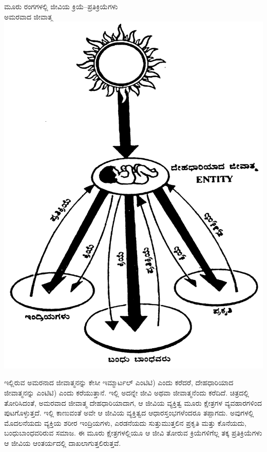 \begin{center}
ಮೂರು ರಂಗಗಳಲ್ಲಿ ಜೀವಿಯ ಕ್ರಿಯೆ–ಪ್ರತಿಕ್ರಿಯೆಗಳು\\
 ಅಮರವಾದ ಜೀವಾತ್ಮ \\\includegraphics[scale=0.8]{"images/chap6_fig1.png"}
\end{center}

ಇಲ್ಲಿರುವ ಅಮರನಾದ ಜೀವಾತ್ಮನನ್ನು ಕೇಸೀ ಇಮ್ಮಾರ್ಟಲ್ ಎಂಟಿಟಿ) ಎಂದು ಕರೆದರೆ, ದೇಹಧಾರಿಯಾದ ಜೀವಾತ್ಮನನ್ನು ಎಂಟಿಟಿ) ಎಂದು ಕರೆಯುತ್ತಾನೆ. ಇಲ್ಲಿ ಅದನ್ನೇ ಜೀವಿ ಅಥವಾ ಜೀವಾತ್ಮನೆಂದು ಕರೆದಿದೆ. ಚಿತ್ರದಲ್ಲಿ ತೋರಿಸಿದಂತೆ, ಅಮರವಾದ ಜೀವಾತ್ಮ ದೇಹಧಾರಿಯಾದಾಗ, ಆ ಜೀವಿಯ ವ್ಯಕ್ತಿತ್ವ ಮೂರು ಕ್ಷೇತ್ರಗಳ ವ್ಯವಹಾರಗಳಿಂದ ಪುಟಗೊಳ್ಳುತ್ತದೆ. ಇಲ್ಲಿ ಕಾಣುವಂತೆ ಅವೇ ಆ ಜೀವಿಯ ವ್ಯಕ್ತಿತ್ವದ ಆಧಾರಸ್ತಂಭಗಳೆಂದರೂ ತಪ್ಪಾಗದು. ಅವುಗಳಲ್ಲಿ ಮೊದಲನೆಯದು ವ್ಯಕ್ತಿಯ ಶರೀರ ಇಂದ್ರಿಯಗಳು, ಎರಡನೆಯದು ಸುತ್ತುಮುತ್ತಲಿನ ಪ್ರಕೃತಿ ಮತ್ತು ಕೊನೆಯದು, ಬಂಧುಬಾಂಧವರಿರುವ ಸಮಾಜ. ಈ ಮೂರು ಕ್ಷೇತ್ರಗಳಲ್ಲಿಯೂ ಆ ಜೀವಿ ತೋರುವ ಕ್ರಿಯೆಗಳಿಗೆಲ್ಲ ತಕ್ಕ ಪ್ರತಿಕ್ರಿಯೆಗಳು ಆ ಜೀವಿಯ ಆಂತರ್ಯದಲ್ಲಿ ದಾಖಲಾಗುತ್ತಲಿರುತ್ತವೆ.

